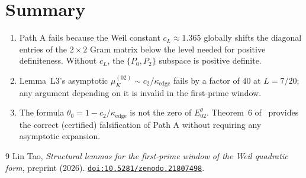 \documentclass[12pt,a4paper]{amsart}
\theoremstyle{plain}
\theoremstyle{definition}
\newcommand{\ctwo}{c_2}
\newcommand{\kappae}{\kappa_{\mathrm{edge}}}
\begin{document}
\section{Summary}

\begin{enumerate}
\item Path A fails because the Weil constant $c_L \approx 1.365$
      globally shifts the diagonal entries of the $2\times2$ Gram matrix
      below the level needed for positive definiteness.
      Without $c_L$, the $\{P_0,P_2\}$ subspace is positive definite.

\item Lemma~L3's asymptotic $\mu_K^{(02)} \sim \ctwo/\kappae$
      fails by a factor of $40$ at $L=7/20$; any argument depending
      on it is invalid in the first-prime window.

\item The formula $\theta_0 = 1 - \ctwo/\kappae$ is not the zero of
      $E_{02}^\theta$.  Theorem~6 of~\cite{WFP2026} provides the
      correct (certified) falsification of Path A without requiring
      any asymptotic expansion.
\end{enumerate}

\begin{thebibliography}{9}
Lin Tao, \emph{Structural lemmas for the first-prime window of the Weil
quadratic form}, preprint (2026).
\href{https://doi.org/10.5281/zenodo.21807498}{\texttt{doi:10.5281/zenodo.21807498}}.
\end{thebibliography}
\end{document}
